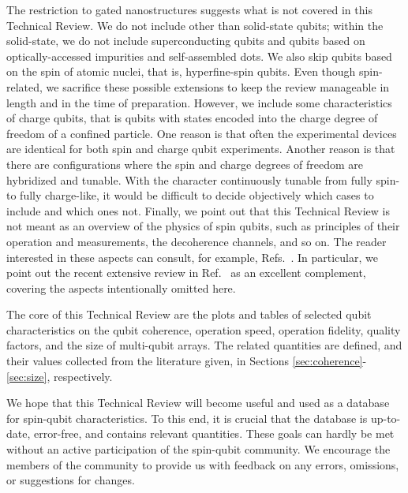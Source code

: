 \documentclass[aps, prx, showpacs, twocolumn, superscriptaddress, notitlepage, longbibliography, floatfix, nofootinbib]{revtex4-2}
\begin{document}
The restriction to gated nanostructures suggests what is not covered in this Technical Review. We do not include other than solid-state qubits; within the solid-state, we do not include superconducting qubits and qubits based on optically-accessed impurities and self-assembled dots. We also skip qubits based on the spin of atomic nuclei, that is, hyperfine-spin qubits. Even though spin-related, we sacrifice these possible extensions to keep the review manageable in length and in the time of preparation. However, we include some characteristics of charge qubits, that is qubits with states encoded into the charge degree of freedom of a confined particle. One reason is that often the experimental devices are identical for both spin and charge qubit experiments. Another reason is that there are configurations where the spin and charge degrees of freedom are hybridized and tunable. With the character continuously tunable from fully spin- to fully charge-like, it would be difficult to decide objectively which cases to include and which ones not. Finally, we point out that this Technical Review is not meant as an overview of the physics of spin qubits, such as principles of their operation and measurements, the decoherence channels, and so on. The reader interested in these aspects can consult, for example, Refs.~\cite{oosterkamp_photon_1999, van_der_wiel_electron_2002, schliemann_electron_2003, hanson_spins_2007, kloeffel_prospects_2013, schreiber_quantum_2014, tahan_opinion_2021, chatterjee_semiconductor_2021, gonzalez-zalba_scaling_2021, scappucci_germanium_2021, oiwa_conversion_2017, vandersypen_quantum_2019, kuemmeth_roadmap_2020, chatterjee_semiconductor_2021}. In particular, we point out the recent extensive review in Ref.~\cite{burkard_semiconductor_2021} as an excellent complement, covering the aspects intentionally omitted here.


The core of this Technical Review are the plots and tables of selected qubit characteristics on the qubit coherence, operation speed, operation fidelity, quality factors, and the size of multi-qubit arrays. The related quantities are defined, and their values collected from the literature given, in Sections \ref{sec:coherence}-\ref{sec:size}, respectively.


We hope that this Technical Review will become useful and used as a database for spin-qubit characteristics. To this end, it is crucial that the database is up-to-date, error-free, and contains relevant quantities. These goals can hardly be met without an active participation of the spin-qubit community. We encourage the members of the community to provide us with feedback on any errors, omissions, or suggestions for changes.
\end{document}
